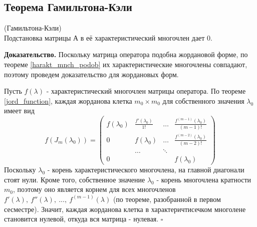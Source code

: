 \subsection{Теорема Гамильтона-Кэли}
\begin{theor}
(Гамильтона-Кэли)\\
Подстановка матрицы А в её характеристический многочлен дает 0.
\end{theor}
\textbf{Доказательство.} Поскольку матрица оператора подобна жордановой форме,
по теореме \ref{harakt_mnch_podob} их характеристические многочлены совпадают,
поэтому проведем доказательство для жордановых форм.

Пусть $f(\lambda)$ - характеристический многочлен матрицы оператора.
По теореме \ref{jord_function}, каждая жорданова клетка $m_0\times m_0$ для
собственного значения $\lambda_0$ имеет вид  
$$f(J_m(\lambda_0))=\begin{pmatrix}f(\lambda_0)&\frac{f'(\lambda_0)}{1!}&
\dots&\frac{f^{(m-1)}(\lambda_0)}{(m-1)!}\\0&f(\lambda_0)&\dots&\frac{f^{(m-2)}
(\lambda_0)}{(m-2)!}\\&\dots&\ddots&\\0&&&f(\lambda_0)\end{pmatrix}$$
Поскольку $\lambda_0$ - корень характеристического многочлена, на главной
диагонали стоят нули. Кроме того, собственное значение $\lambda_0$ - корень
многочлена кратности $m_0$, поэтому оно является корнем для всех многочленов 
$f'(\lambda),~f''(\lambda),~...,~f^{(m-1)}(\lambda)$ (по теореме, разобранной
в первом сесместре). Значит, каждая жорданова клетка в характеричтисечком 
многолене становится нулевой, откуда вся матрица - нулевая. $\square$




\newpage
